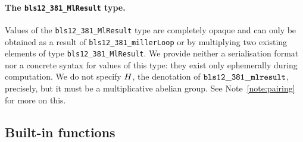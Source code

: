 \paragraph{The \texttt{bls12\_381\_MlResult} type.}
\noindent Values of the \texttt{bls12\_381\_MlResult} type are completely
opaque and can only be obtained as a result of \texttt{bls12\_381\_millerLoop}
or by multiplying two existing elements of type \texttt{bls12\_381\_MlResult}.
We provide neither a serialisation format nor a concrete syntax for values of
this type: they exist only ephemerally during computation.  We do not specify
$H$, the denotation of $\mathtt{bls12\_381\_mlresult}$, precisely, but it
must be a multiplicative abelian group. See Note~\ref{note:pairing} for more on
this.

\subsection{Built-in functions}
\label{sec:future-built-in-functions}

\newcommand{\hash}{\mathsf{hash}}
\newcommand{\compress}{\mathsf{compress}}
\newcommand{\uncompress}{\mathsf{uncompress}}

